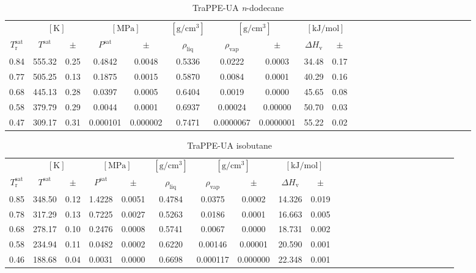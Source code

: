 \documentclass[%
 aip,
 jcp,
 sd,%
 amsmath,amssymb,
]{revtex4-1}
\begin{document}
\begin{table*}[]
\centering
\caption{
TraPPE-UA \textit{n}-dodecane
}
\label{tab:TraPPE-C12-trappe}
\begin{ruledtabular}
\begin{tabular}{cccccccccccccccccccccccc}
 & \multicolumn{2}{c}{$[\mathrm{K}]$} &	 \multicolumn{2}{c}{$[\mathrm{MPa}]$} & $[\mathrm{g/cm^3}]$ & \multicolumn{2}{c}{$[\mathrm{g/cm^3}]$} & \multicolumn{2}{c}{$[\mathrm{kJ/mol}]$} \\
$T_\mathrm{r}^{\mathrm{sat}}$ & $T^{\mathrm{sat}}$ & $\pm$ & $P^{\mathrm{sat}}$ & $\pm$ & $\rho_{\mathrm{liq}}$ & $\rho_{\mathrm{vap}}$ & $\pm$ & $\Delta H_{\mathrm{v}}$ & $\pm$
 \\
\hline		
0.84	&	555.32	&	0.25	&	0.4842	&	0.0048	&	0.5336	&	0.0222	&	0.0003	&	34.48	&	0.17	\\
0.77	&	505.25	&	0.13	&	0.1875	&	0.0015	&	0.5870	&	0.0084	&	0.0001	&	40.29	&	0.16	\\
0.68	&	445.13	&	0.28	&	0.0397	&	0.0005	&	0.6404	&	0.0019	&	0.0000	&	45.65	&	0.08	\\
0.58	&	379.79	&	0.29	&	0.0044	&	0.0001	&	0.6937	&	0.00024	&	0.00000	&	50.70	&	0.03	\\
0.47	&	309.17	&	0.31	&	0.000101	&	0.000002	&	0.7471	&	0.0000067	&	0.0000001	&	55.22	&	0.02	\\
\end{tabular}
\end{ruledtabular}
\end{table*}


\begin{table*}[]
\centering
\caption{
TraPPE-UA isobutane
}
\label{tab:TraPPE-iC4-trappe}
\begin{ruledtabular}
\begin{tabular}{cccccccccccccccccccccccc}
 & \multicolumn{2}{c}{$[\mathrm{K}]$} &	 \multicolumn{2}{c}{$[\mathrm{MPa}]$} & $[\mathrm{g/cm^3}]$ & \multicolumn{2}{c}{$[\mathrm{g/cm^3}]$} & \multicolumn{2}{c}{$[\mathrm{kJ/mol}]$} \\
$T_\mathrm{r}^{\mathrm{sat}}$ & $T^{\mathrm{sat}}$ & $\pm$ & $P^{\mathrm{sat}}$ & $\pm$ & $\rho_{\mathrm{liq}}$ & $\rho_{\mathrm{vap}}$ & $\pm$ & $\Delta H_{\mathrm{v}}$ & $\pm$
 \\
\hline		
0.85	&	348.50	&	0.12	&	1.4228	&	0.0051	&	0.4784	&	0.0375	&	0.0002	&	14.326	&	0.019	\\
0.78	&	317.29	&	0.13	&	0.7225	&	0.0027	&	0.5263	&	0.0186	&	0.0001	&	16.663	&	0.005	\\
0.68	&	278.17	&	0.10	&	0.2476	&	0.0008	&	0.5741	&	0.0067	&	0.0000	&	18.731	&	0.002	\\
0.58	&	234.94	&	0.11	&	0.0482	&	0.0002	&	0.6220	&	0.00146	&	0.00001	&	20.590	&	0.001	\\
0.46	&	188.68	&	0.04	&	0.0031	&	0.0000	&	0.6698	&	0.000117	&	0.000000	&	22.348	&	0.001	\\
\end{tabular}
\end{ruledtabular}
\end{table*}
\end{document}
